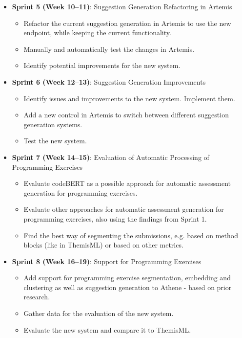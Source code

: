 \begin{itemize}
\begin{itemize}
    \end{itemize}
    \item \textbf{Sprint 5 (Week 10--11)}: Suggestion Generation Refactoring in Artemis
    \begin{itemize}
        \item Refactor the current suggestion generation in Artemis to use the new endpoint, while keeping the current functionality.
        \item Manually and automatically test the changes in Artemis.
        \item Identify potential improvements for the new system.
    \end{itemize}
    \item \textbf{Sprint 6 (Week 12--13)}: Suggestion Generation Improvements
    \begin{itemize}
        \item Identify issues and improvements to the new system. Implement them.
        \item Add a new control in Artemis to switch between different suggestion generation systems.
        \item Test the new system.
    \end{itemize}
    \item \textbf{Sprint 7 (Week 14--15)}: Evaluation of Automatic Processing of Programming Exercises
    \begin{itemize}
        \item Evaluate codeBERT as a possible approach for automatic assessment generation for programming exercises.
        \item Evaluate other approaches for automatic assessment generation for programming exercises, also using the findings from Sprint 1.
        \item Find the best way of segmenting the submissions, e.g. based on method blocks (like in ThemisML) or based on other metrics.
    \end{itemize}
    \item \textbf{Sprint 8 (Week 16--19)}: Support for Programming Exercises
    \begin{itemize}
        \item Add support for programming exercise segmentation, embedding and clustering as well as suggestion generation to Athene - based on prior research.
        \item Gather data for the evaluation of the new system.
        \item Evaluate the new system and compare it to ThemisML.

\end{itemize}
\end{itemize}
